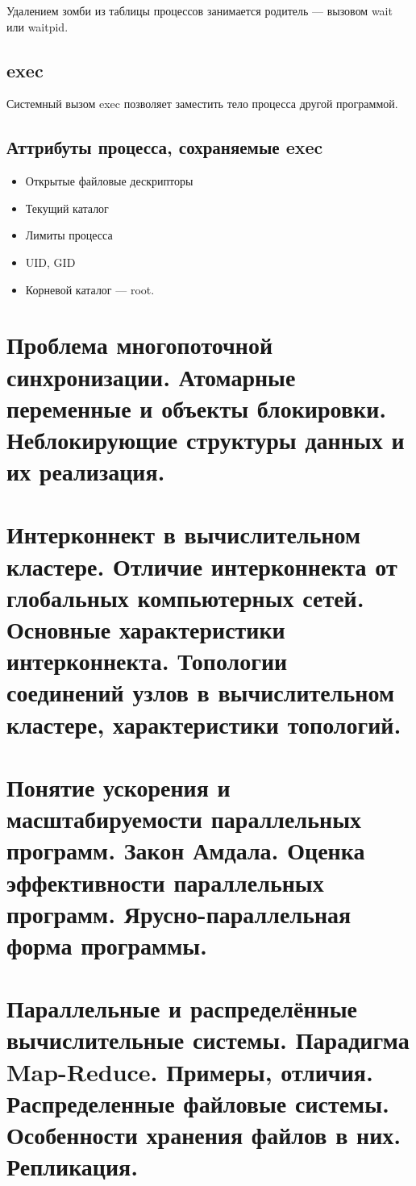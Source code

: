 \begin{multicols}{2}
    Удалением зомби из таблицы процессов занимается родитель --- 
    вызовом wait или waitpid.
    
    \subsection*{exec}
    
    Системный вызом exec позволяет заместить тело процесса другой программой.
    
    \subsection*{Аттрибуты процесса, сохраняемые exec}
    
    \begin{itemize}
      \item Открытые файловые дескрипторы 
      \item Текущий каталог
      \item Лимиты процесса
      \item UID, GID
      \item Корневой каталог --- root.
    \end{itemize}
    \section{Проблема многопоточной синхронизации. Атомарные переменные и объекты
    блокировки. Неблокирующие структуры данных и их реализация.}
    \section{Интерконнект в вычислительном кластере. Отличие интерконнекта от глобальных
    компьютерных сетей. Основные характеристики интерконнекта. Топологии соединений
    узлов в вычислительном кластере, характеристики топологий.}
    \columnbreak

    \section{Понятие ускорения и масштабируемости параллельных программ. Закон Амдала.
    Оценка эффективности параллельных программ. Ярусно-параллельная форма
    программы.}

    \section{Параллельные и распределённые вычислительные системы. Парадигма Map-Reduce.
    Примеры, отличия. Распределенные файловые системы. Особенности хранения файлов
    в них. Репликация.
    }
\end{multicols}